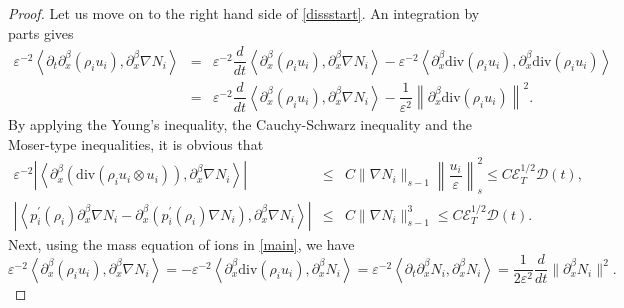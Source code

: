 \documentclass[reqno,twoside,12pt,a4paper]{amsart}
\newcommand{\eps}{\mathbb{\varepsilon}}
\newcommand{\dive}{\mathrm{div}}
\newcommand{\pt}{\partial_t}
\newcommand{\pa}{\partial}
\newcommand{\cubic}{C\mathscr{E}_T^{1/2}\mathscr{D}(t)}
\numberwithin{equation}{section}
\begin{document}
\begin{proof}
Let us move on to the right hand side of \eqref{dissstart}. An integration by parts gives
\begin{eqnarray*}
\eps^{-2} \left<\pt\pa_x^\beta (\rho_iu_i), \pa_x^\beta \nabla N_i\right> &=& \eps^{-2}\dfrac{d}{dt}\left<\pa_x^\beta (\rho_i u_i), \pa_x^\beta \nabla N_i \right>-\eps^{-2}\left<\pa_x^\beta \dive (\rho_i u_i), \pa_x^\beta \dive(\rho_iu_i)\right>\nonumber\\
&=&\eps^{-2}\dfrac{d}{dt}\left<\pa_x^\beta (\rho_i u_i), \pa_x^\beta \nabla N_i \right> -\dfrac{1}{\eps^2}\left\|\pa_x^\beta\dive(\rho_i u_i)\right\|^2.
\end{eqnarray*}
By applying the Young's inequality, the Cauchy-Schwarz inequality and the Moser-type inequalities, it is obvious that
\begin{eqnarray*}
\eps^{-2}|\left<\pa_x^\beta(\dive(\rho_i u_i\otimes u_i)),\pa_x^\beta \nabla N_i\right>|&\leq& C\|\nabla N_i\|_{s-1}\left\|\dfrac{u_i}{\eps}\right\|_s^2\leq \cubic ,\nonumber\\
|\left<p_i^\prime(\rho_i)\pa_x^\beta \nabla N_i-\pa_x^\beta(p_i^\prime(\rho_i)\nabla N_i),\pa_x^\beta \nabla N_i\right>|&\leq& C \|\nabla N_i\|_{s-1}^3\leq \cubic.
\end{eqnarray*}
Next, using the mass equation of ions in \eqref{main}, we have
\[
\eps^{-2}\left<\pa_x^\beta (\rho_i u_i),\pa_x^\beta \nabla N_i\right> =-\eps^{-2}\left<\pa_x^\beta \dive(\rho_i u_i), \pa_x^\beta N_i \right>=\eps^{-2}\left<\pt\pa_x^\beta N_i, \pa_x^\beta N_i\right>=\dfrac{1}{2\eps^2}\dfrac{d}{dt}\|\pa_x^\beta N_i\|^2.
\]


\end{proof}
\end{document}
